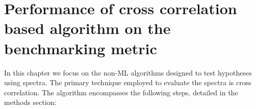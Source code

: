 \chapter{Performance of cross correlation based algorithm on the benchmarking metric}
\label{chap:III.4}
In this chapter we focus on the non-ML algorithms designed to test hypotheses using spectra. The primary technique employed to evaluate the spectra is cross correlation. The algorithm encompasses the following steps, detailed in the methods section:
